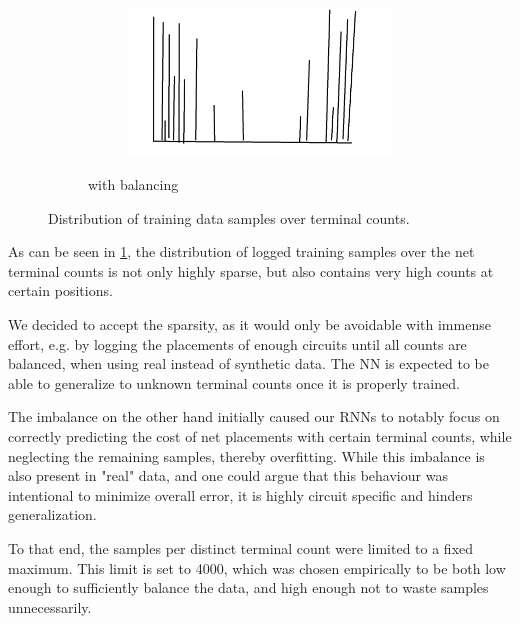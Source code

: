 \begin{figure}
\begin{subfigure}[b]{0.45\linewidth}
\begin{subfigure}[b]{\linewidth}
		\end{subfigure}
		\begin{subfigure}[b]{\linewidth}
			\includegraphics[width=\linewidth]{plots/data-distribution-placeholder.png}
		\end{subfigure}
		\caption{with balancing}
	\end{subfigure}
	\caption{Distribution of training data samples over terminal counts.}
	\label{fig:data-hist}
\end{figure}

As can be seen in \ref{fig:data-hist}, the distribution of logged training samples over the net terminal counts is not only highly sparse, but also contains very high counts at certain positions.

We decided to accept the sparsity, as it would only be avoidable with immense effort, e.g. by logging the placements of enough circuits until all counts are balanced, when using real instead of synthetic data. The \gls{NN} is expected to be able to generalize to unknown terminal counts once it is properly trained.

The imbalance on the other hand initially caused our \glspl{RNN} to notably focus on correctly predicting the cost of net placements with certain terminal counts, while neglecting the remaining samples, thereby overfitting. While this imbalance is also present in "real" data, and one could argue that this behaviour was intentional to minimize overall error, it is highly circuit specific and hinders generalization.

To that end, the samples per distinct terminal count were limited to a fixed maximum. This limit is set to 4000, which was chosen empirically to be both low enough to sufficiently balance the data, and high enough not to waste samples unnecessarily.

